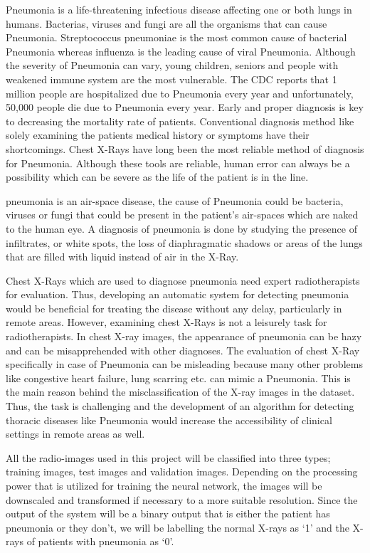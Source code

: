 \documentclass[12pt, a4paper]{report}
\begin{document}
Pneumonia is a life-threatening infectious disease affecting one or both lungs in humans. Bacterias, viruses and fungi are all the organisms that can cause Pneumonia. Streptococcus pneumoniae is the most common cause of bacterial Pneumonia whereas influenza is the leading cause of viral Pneumonia. Although the severity of Pneumonia can vary, young children, seniors and people with weakened immune system are the most vulnerable. The CDC reports that 1 million people are hospitalized due to Pneumonia every year and unfortunately, 50,000 people die due to Pneumonia every year. Early and proper diagnosis is key to decreasing the mortality rate of patients. Conventional diagnosis method like solely examining the patients medical history or symptoms have their shortcomings. Chest X-Rays have long been the most reliable method of diagnosis for Pneumonia. Although these tools are reliable, human error can always be a possibility which can be severe as the life of the patient is in the line.

pneumonia is an air-space disease, the cause of Pneumonia could be bacteria, viruses or fungi that could be present in the patient’s air-spaces which are naked to the human eye. A diagnosis of pneumonia is done by studying the presence of infiltrates, or white spots, the loss of diaphragmatic shadows or areas of the lungs that are filled with liquid instead of air in the X-Ray.

Chest X-Rays which are used to diagnose pneumonia need expert radiotherapists for evaluation. Thus, developing an automatic system for detecting pneumonia would be beneficial for treating the disease without any delay, particularly in remote areas. However, examining chest X-Rays is not a leisurely task for radiotherapists. In chest X-ray images, the appearance of pneumonia can be hazy and can be misapprehended with other diagnoses. The evaluation of chest X-Ray specifically in case of Pneumonia can be misleading because many other problems like congestive heart failure, lung scarring etc. can mimic a Pneumonia. This is the main reason behind the misclassification of the X-ray images in the dataset. Thus, the task is challenging and the development of an algorithm for detecting thoracic diseases like Pneumonia would increase the accessibility of clinical settings in remote areas as well. 

All the radio-images used in this project will be classified into three types; training images, test images and validation images. Depending on the processing power that is utilized for training the neural network, the images will be downscaled and transformed if necessary to a more suitable resolution. Since the output of the system will be a binary output that is either the patient has pneumonia or they don’t, we will be labelling the normal X-rays as ‘1’ and the X-rays of patients with pneumonia as ‘0’.
\end{document}
